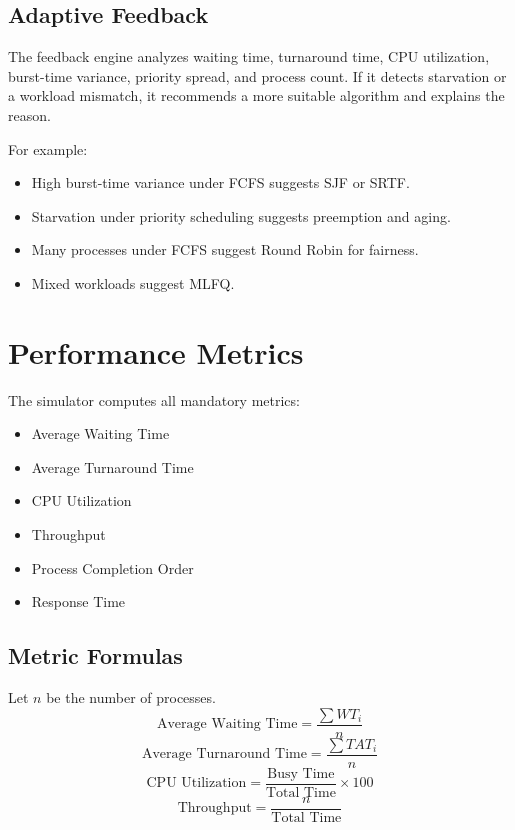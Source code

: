 \documentclass[12pt]{article}
\begin{document}
\subsection{Adaptive Feedback}
The feedback engine analyzes waiting time, turnaround time, CPU utilization, burst-time variance, priority spread, and process count. If it detects starvation or a workload mismatch, it recommends a more suitable algorithm and explains the reason.

For example:
\begin{itemize}[leftmargin=*]
    \item High burst-time variance under FCFS suggests SJF or SRTF.
    \item Starvation under priority scheduling suggests preemption and aging.
    \item Many processes under FCFS suggest Round Robin for fairness.
    \item Mixed workloads suggest MLFQ.
\end{itemize}

\section{Performance Metrics}
The simulator computes all mandatory metrics:
\begin{itemize}[leftmargin=*]
    \item Average Waiting Time
    \item Average Turnaround Time
    \item CPU Utilization
    \item Throughput
    \item Process Completion Order
    \item Response Time
\end{itemize}

\subsection{Metric Formulas}
Let $n$ be the number of processes.
\[
\text{Average Waiting Time} = \frac{\sum WT_i}{n}
\]
\[
\text{Average Turnaround Time} = \frac{\sum TAT_i}{n}
\]
\[
\text{CPU Utilization} = \frac{\text{Busy Time}}{\text{Total Time}} \times 100
\]
\[
\text{Throughput} = \frac{n}{\text{Total Time}}
\]
\end{document}

